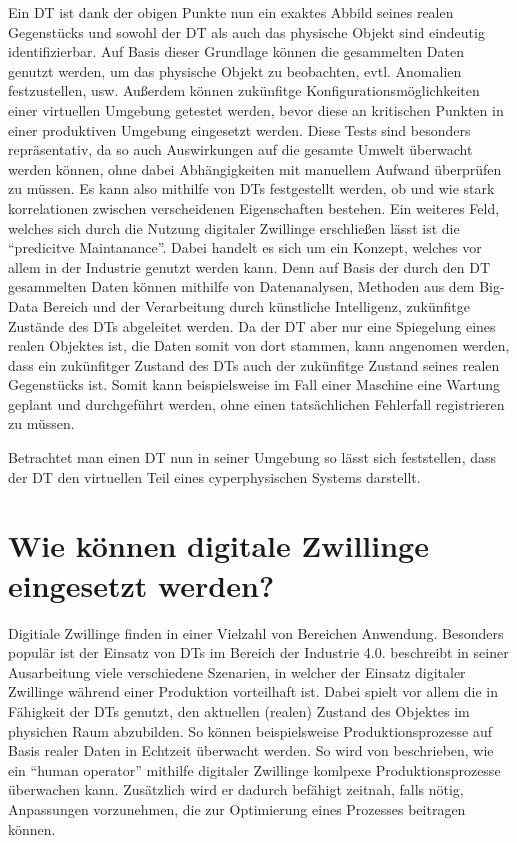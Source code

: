 Ein \ac{DT} ist dank der obigen Punkte nun ein exaktes Abbild seines realen Gegenstücks und sowohl der \ac{DT} als auch das physische Objekt sind eindeutig identifizierbar. Auf Basis dieser Grundlage können die gesammelten Daten genutzt werden, um das physische Objekt zu beobachten, evtl. Anomalien festzustellen, usw. Außerdem können zukünfitge Konfigurationsmöglichkeiten einer virtuellen Umgebung getestet werden, bevor diese an kritischen Punkten in einer produktiven Umgebung eingesetzt werden. Diese Tests sind besonders repräsentativ, da so auch Auswirkungen auf die gesamte Umwelt überwacht werden können, ohne dabei Abhängigkeiten mit manuellem Aufwand überprüfen zu müssen. Es kann also mithilfe von \ac{DT}s festgestellt werden, ob und wie stark korrelationen zwischen verscheidenen Eigenschaften bestehen. Ein weiteres Feld, welches sich durch die Nutzung digitaler Zwillinge erschließen lässt ist die \enquote{predicitve Maintanance}. Dabei handelt es sich um ein Konzept, welches vor allem in der Industrie genutzt werden kann. Denn auf Basis der durch den \ac{DT} gesammelten Daten können mithilfe von Datenanalysen, Methoden aus dem Big-Data Bereich und der Verarbeitung durch künstliche Intelligenz, zukünfitge Zustände des \ac{DT}s abgeleitet werden. Da der \ac{DT} aber nur eine Spiegelung eines realen Objektes ist, die Daten somit von dort stammen, kann angenomen werden, dass ein zukünfitger Zustand des \ac{DT}s auch der zukünfitge Zustand seines realen Gegenstücks ist. Somit kann beispielsweise im Fall einer Maschine eine Wartung geplant und durchgeführt werden, ohne einen tatsächlichen Fehlerfall registrieren zu müssen.

Betrachtet man einen \ac{DT} nun in seiner Umgebung so lässt sich feststellen, dass der \ac{DT} den virtuellen Teil eines cyperphysischen Systems darstellt.

\section{Wie können digitale Zwillinge eingesetzt werden?}

Digitiale Zwillinge finden in einer Vielzahl von Bereichen Anwendung. Besonders populär ist der Einsatz von \ac{DT}s im Bereich der Industrie 4.0. \citeauthor{tao2018digital} beschreibt in seiner Ausarbeitung viele verschiedene Szenarien, in welcher der Einsatz digitaler Zwillinge während einer Produktion vorteilhaft ist. Dabei spielt vor allem die in Fähigkeit der \ac{DT}s genutzt, den aktuellen (realen) Zustand des Objektes im physichen Raum abzubilden. So können beispielsweise Produktionsprozesse auf Basis realer Daten in Echtzeit überwacht werden. \autocite{tao2018digital} So wird von \citeauthor{weyer2016future} beschrieben, wie ein \enquote{human operator} mithilfe digitaler Zwillinge komlpexe Produktionsprozesse überwachen kann. Zusätzlich wird er dadurch befähigt zeitnah, falls nötig, Anpassungen vorzunehmen, die zur Optimierung eines Prozesses beitragen können.\autocite{weyer2016future}


